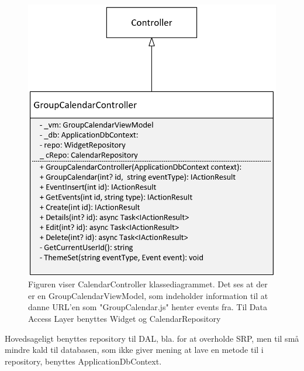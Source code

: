 \begin{figure}[H]
    \centering
    \includegraphics[width=0.5\linewidth]{09_Arkitektur/Calendar/Images/CalendarController.png}
    \caption{Figuren viser CalendarController klassediagrammet. Det ses at der er en GroupCalendarViewModel, som indeholder information til at danne URL'en som "GroupCalendar.js" henter events fra. Til Data Access Layer benyttes Widget og CalendarRepository }
    \label{fig:CalendarControllerClass}
\end{figure}{}

Hovedsageligt benyttes repository til DAL, bla. for at overholde SRP, men til små mindre kald til databasen, som ikke giver mening at lave en metode til i repository, benyttes ApplicationDbContext. \newline